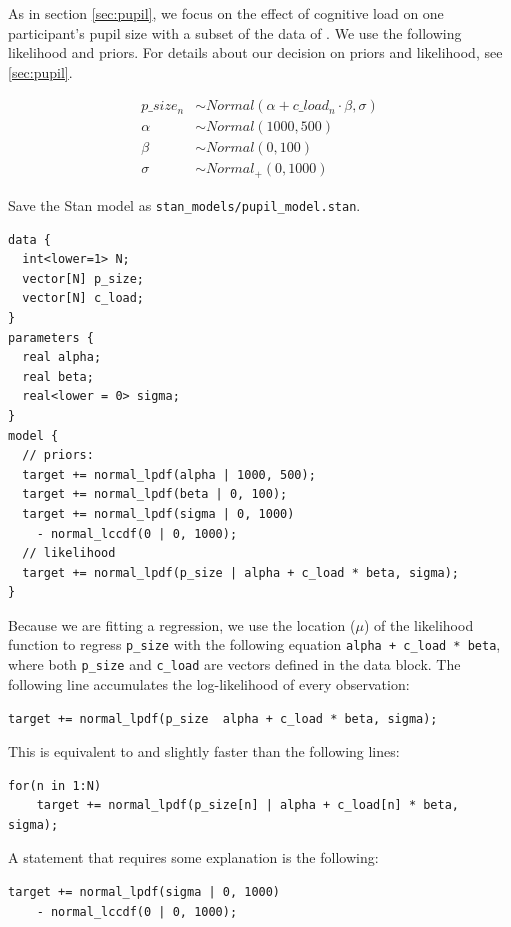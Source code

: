 \documentclass[12pt,]{krantz}
\theoremstyle{definition}
\theoremstyle{definition}
\theoremstyle{definition}
\theoremstyle{remark}
\begin{document}
As in section \ref{sec:pupil}, we focus on the effect of cognitive load
on one participant's pupil size with a subset of the data of
\citet{wahnPupilSizesScale2016}. We use the following likelihood and
priors. For details about our decision on priors and likelihood, see
\ref{sec:pupil}.

\begin{equation}
\begin{aligned}
p\_size_n &\sim Normal(\alpha + c\_load_n \cdot \beta,\sigma) \\
\alpha &\sim Normal(1000, 500) \\
\beta &\sim Normal(0, 100) \\
\sigma &\sim Normal_+(0, 1000)
\end{aligned}
\end{equation}

Save the Stan model as \texttt{stan\_models/pupil\_model.stan}.

\begin{verbatim}
data {
  int<lower=1> N;
  vector[N] p_size;
  vector[N] c_load;
}
parameters {
  real alpha;
  real beta;
  real<lower = 0> sigma;
}
model {
  // priors:
  target += normal_lpdf(alpha | 1000, 500);
  target += normal_lpdf(beta | 0, 100);
  target += normal_lpdf(sigma | 0, 1000)
    - normal_lccdf(0 | 0, 1000);
  // likelihood
  target += normal_lpdf(p_size | alpha + c_load * beta, sigma);
}
\end{verbatim}

Because we are fitting a regression, we use the location (\(\mu\)) of
the likelihood function to regress \texttt{p\_size} with the following
equation \texttt{alpha\ +\ c\_load\ *\ beta}, where both
\texttt{p\_size} and \texttt{c\_load} are vectors defined in the data
block. The following line accumulates the log-likelihood of every
observation:

\texttt{target\ +=\ normal\_lpdf(p\_size\ \textbar{}\ alpha\ +\ c\_load\ *\ beta,\ sigma);}

This is equivalent to and slightly faster than the following lines:

\begin{verbatim}
for(n in 1:N)
    target += normal_lpdf(p_size[n] | alpha + c_load[n] * beta, sigma);
\end{verbatim}

A statement that requires some explanation is the following:

\begin{verbatim}
target += normal_lpdf(sigma | 0, 1000)
    - normal_lccdf(0 | 0, 1000);
\end{verbatim}
\end{document}

